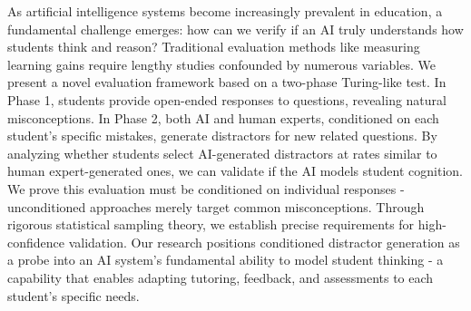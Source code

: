 As artificial intelligence systems become increasingly prevalent in education, a fundamental challenge emerges: how can we verify if an AI truly understands how students think and reason? Traditional evaluation methods like measuring learning gains require lengthy studies confounded by numerous variables. We present a novel evaluation framework based on a two-phase Turing-like test. In Phase 1, students provide open-ended responses to questions, revealing natural misconceptions. In Phase 2, both AI and human experts, conditioned on each student's specific mistakes, generate distractors for new related questions. By analyzing whether students select AI-generated distractors at rates similar to human expert-generated ones, we can validate if the AI models student cognition. We prove this evaluation must be conditioned on individual responses - unconditioned approaches merely target common misconceptions. Through rigorous statistical sampling theory, we establish precise requirements for high-confidence validation. Our research positions conditioned distractor generation as a probe into an AI system's fundamental ability to model student thinking - a capability that enables adapting tutoring, feedback, and assessments to each student's specific needs.

